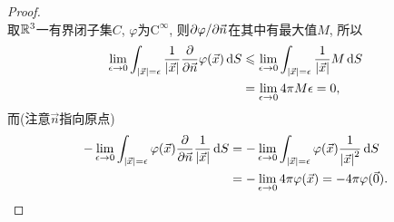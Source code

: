 \begin{proof}
\begin{equation}
    \end{equation}
    取$\mathbb{R}^3$一有界闭子集$C$, $\varphi$为$\text{C}^\infty$, 则$\partial\varphi/\partial\vec{n}$在其中有最大值$M$, 所以
    \begin{align}
        \lim_{\epsilon\to 0}\int_{\left\lvert \vec{x}\right\rvert =\epsilon}\frac{1}{\left\lvert \vec{x}\right\rvert }\frac{\partial}{\partial\vec{n}}\varphi(\vec{x})\,\mathrm{d} S
        &\leqslant\lim_{\epsilon\to 0}\int_{\left\lvert \vec{x}\right\rvert =\epsilon}\frac{1}{\left\lvert \vec{x}\right\rvert}M\,\mathrm{d} S\\
        &=\lim_{\epsilon\to 0}4\pi M\epsilon=0,
    \end{align}
    而(注意$\vec{n}$指向原点)
    \begin{align}
        -\lim_{\epsilon\to 0}\int_{\left\lvert \vec{x}\right\rvert =\epsilon}\varphi(\vec{x})\frac{\partial}{\partial\vec{n}}\frac{1}{\left\lvert \vec{x}\right\rvert }\,\mathrm{d} S
        &=-\lim_{\epsilon\to 0}\int_{\left\lvert \vec{x}\right\rvert =\epsilon}\varphi(\vec{x})\frac{1}{\left\lvert \vec{x}\right\rvert^2 }\,\mathrm{d} S\\
        &=-\lim_{\epsilon\to 0}4\pi\varphi(\vec{x})=-4\pi\varphi(\vec{0}).
    \end{align}
\end{proof}
